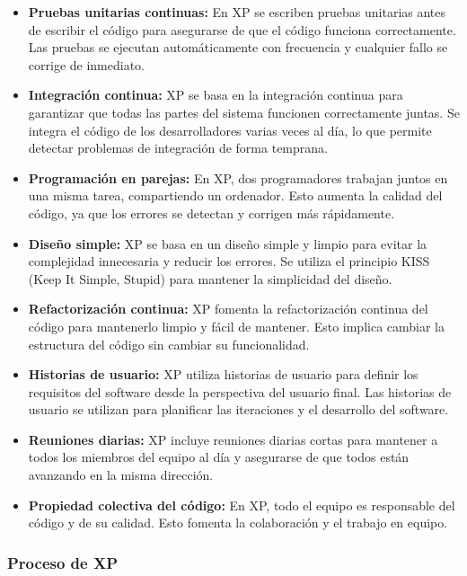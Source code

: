 \documentclass[executivepaper]{article}
\begin{document}
\begin{itemize}
\item {\bf Pruebas unitarias continuas:} En XP se escriben pruebas unitarias antes de escribir el código para asegurarse de que el código funciona correctamente. Las pruebas se ejecutan automáticamente con frecuencia y cualquier fallo se corrige de inmediato.

\item {\bf Integración continua:} XP se basa en la integración continua para garantizar que todas las partes del sistema funcionen correctamente juntas. Se integra el código de los desarrolladores varias veces al día, lo que permite detectar problemas de integración de forma temprana.

\item {\bf Programación en parejas:} En XP, dos programadores trabajan juntos en una misma tarea, compartiendo un ordenador. Esto aumenta la calidad del código, ya que los errores se detectan y corrigen más rápidamente.

\item {\bf Diseño simple:} XP se basa en un diseño simple y limpio para evitar la complejidad innecesaria y reducir los errores. Se utiliza el principio KISS (Keep It Simple, Stupid) para mantener la simplicidad del diseño.

\item {\bf Refactorización continua:} XP fomenta la refactorización continua del código para mantenerlo limpio y fácil de mantener. Esto implica cambiar la estructura del código sin cambiar su funcionalidad.

\item {\bf Historias de usuario:} XP utiliza historias de usuario para definir los requisitos del software desde la perspectiva del usuario final. Las historias de usuario se utilizan para planificar las iteraciones y el desarrollo del software.

\item {\bf Reuniones diarias:} XP incluye reuniones diarias cortas para mantener a todos los miembros del equipo al día y asegurarse de que todos están avanzando en la misma dirección.

\item {\bf Propiedad colectiva del código:} En XP, todo el equipo es responsable del código y de su calidad. Esto fomenta la colaboración y el trabajo en equipo.

\end{itemize}

\subsubsection*{Proceso de XP}
\end{document}
